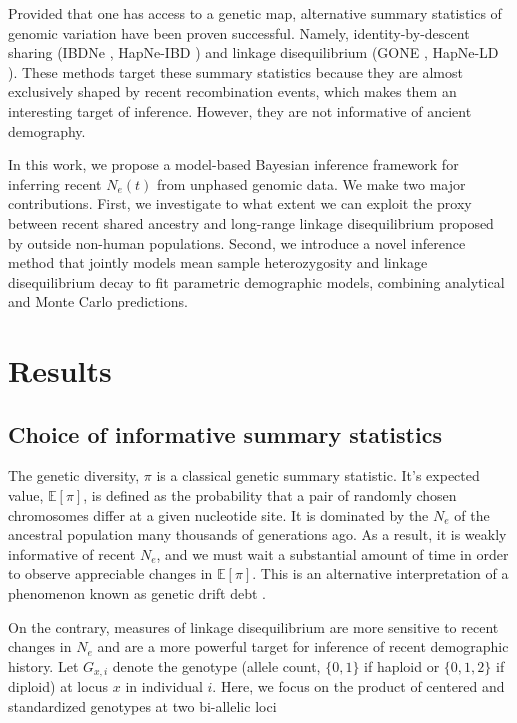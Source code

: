 \documentclass[12pt]{article}
\begin{document}
Provided that one has access to a genetic map, alternative summary statistics of genomic variation have been proven successful. Namely, identity-by-descent sharing (IBDNe \citep{Browning_2015}, HapNe-IBD \citep{Fournier_2023}) and linkage disequilibrium (GONE \citep{Santiago_2020}, HapNe-LD \citep{Fournier_2023}). These methods target these summary statistics because they are almost exclusively shaped by recent recombination events, which makes them an interesting target of inference. However, they are not informative of ancient demography.

In this work, we propose a model-based Bayesian inference framework for inferring recent $N_e(t)$ from unphased genomic data. We make two major contributions. First, we investigate to what extent we can exploit the proxy between recent shared ancestry and long-range linkage disequilibrium proposed by \citet{Fournier_2023} outside non-human populations. Second, we introduce a novel inference method that jointly models mean sample heterozygosity and linkage disequilibrium decay to fit parametric demographic models, combining analytical and Monte Carlo predictions.

\section{Results}

\subsection{Choice of informative summary statistics}

The genetic diversity, $\pi$ is a classical genetic summary statistic. It's expected value, $\mathbb{E}[\pi]$, is defined as the probability that a pair of randomly chosen chromosomes differ at a given nucleotide site. It is dominated by the $N_e$ of the ancestral population many thousands of generations ago. As a result, it is weakly informative of recent $N_e$, and we must wait a substantial amount of time in order to observe appreciable changes in $\mathbb{E}[\pi]$. This is an alternative interpretation of a phenomenon known as genetic drift debt \citep{Gargiulo_2025}.

On the contrary, measures of linkage disequilibrium are more sensitive to recent changes in $N_e$ and are a more powerful target for inference of recent demographic history. Let $G_{x,i}$ denote the genotype (allele count, $\{0, 1\}$ if haploid or $\{0, 1, 2\}$ if diploid) at locus $x$ in individual $i$. Here, we focus on the product of centered and standardized genotypes at two bi-allelic loci
\end{document}
